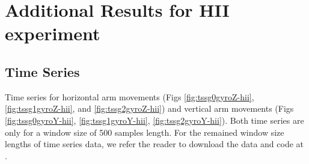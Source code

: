 \chapter{Additional Results for HII experiment} \label{appendix:d}


\graphicspath{{figs/appendixD/PDF/}}



\section{Time Series} \label{appendix:d:ts}
Time series for horizontal arm movements 
(Figs \ref{fig:tssg0gyroZ-hii}, 
\ref{fig:tssg1gyroZ-hii}, and \ref{fig:tssg2gyroZ-hii})
and vertical arm movements 
(Figs \ref{fig:tssg0gyroY-hii}, \ref{fig:tssg1gyroY-hii},
\ref{fig:tssg2gyroY-hii}).
Both time series are only for a window size of 500 samples length.
For the remained window size lengths of time series data, we refer
the reader to download the data and code at \cite{xochicale2018}.
